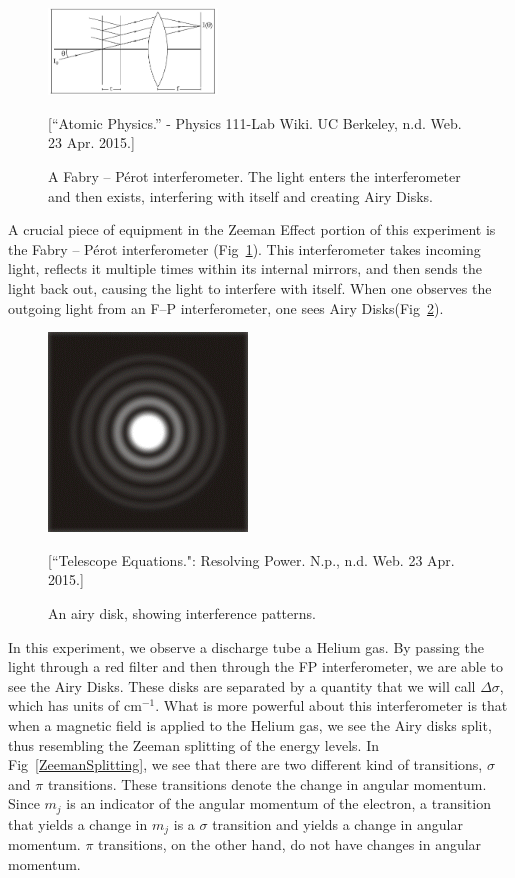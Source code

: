 \begin{figure}[t]
  \includegraphics[width = 0.4\textwidth]{FabryPerot.png}
  \begin{center}
  \caption{A Fabry -- P\'{e}rot interferometer. The light enters the interferometer and then exists, interfering with itself and creating Airy Disks.}[\footnotesize{``Atomic Physics.'' - Physics 111-Lab Wiki. UC Berkeley, n.d. Web. 23 Apr. 2015.}]
  \label{FP}
  \end{center}
\end{figure}

A crucial piece of equipment in the Zeeman Effect portion of this experiment is the Fabry -- P\'{e}rot interferometer (Fig~\ref{FP}). This interferometer takes incoming light, reflects it multiple times within its internal mirrors, and then sends the light back out, causing the light to interfere with itself. When one observes the outgoing light from an F--P interferometer, one sees Airy Disks(Fig~\ref{AiryDisk}).

\begin{figure}[t]
  \includegraphics[width = 5 cm]{AiryDisk.png}
  \begin{center}
  \caption{An airy disk, showing interference patterns.}[\footnotesize{``Telescope Equations.": Resolving Power. N.p., n.d. Web. 23 Apr. 2015.}]
  \label{AiryDisk}
  \end{center}
\end{figure}

In this experiment, we observe a discharge tube a Helium gas. By passing the light through a red filter and then through the FP interferometer, we are able to see the Airy Disks. These disks are separated by a quantity that we will call $\Delta \sigma$, which has units of cm$^{-1}$. What is more powerful about this interferometer is that when a magnetic field is applied to the Helium gas, we see the Airy disks split, thus resembling the Zeeman splitting of the energy levels. In Fig~\ref{ZeemanSplitting}, we see that there are two different kind of transitions, $\sigma$ and $\pi$ transitions. These transitions denote the change in angular momentum. Since $m_j$ is an indicator of the angular momentum of the electron, a transition that yields a change in $m_j$ is a $\sigma$ transition and yields a change in angular momentum. $\pi$ transitions, on the other hand, do not have changes in angular momentum. 


